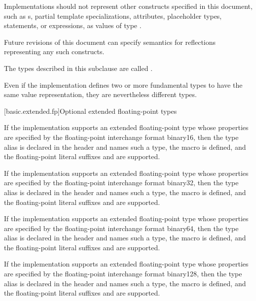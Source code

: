 \pnum
\recommended
Implementations should not represent other constructs
specified in this document, such as
s,
partial template specializations,
attributes, placeholder types,
statements, or
expressions,
as values of type .
\begin{note}
Future revisions of this document can specify semantics for reflections
representing any such constructs.
\end{note}

\pnum
{}%
The types described in this subclause
are called .
\begin{note}
Even if the implementation defines two or more fundamental types to have the
same value representation, they are nevertheless different types.
\end{note}

[basic.extended.fp]{Optional extended floating-point types}

\pnum
If the implementation supports an extended floating-point type
whose properties are specified by
the \IsoFloatUndated{} floating-point interchange format binary16,
then the type alias 
is declared in the header  and names such a type,
the macro  is defined, and
the floating-point literal suffixes  and 
are supported.

\pnum
If the implementation supports an extended floating-point type
whose properties are specified by
the \IsoFloatUndated{} floating-point interchange format binary32,
then the type alias 
is declared in the header  and names such a type,
the macro  is defined, and
the floating-point literal suffixes  and  are supported.

\pnum
If the implementation supports an extended floating-point type
whose properties are specified by
the \IsoFloatUndated{} floating-point interchange format binary64,
then the type alias 
is declared in the header  and names such a type,
the macro  is defined, and
the floating-point literal suffixes  and  are supported.

\pnum
If the implementation supports an extended floating-point type
whose properties are specified by
the \IsoFloatUndated{} floating-point interchange format binary128,
then the type alias 
is declared in the header  and names such a type,
the macro  is defined, and
the floating-point literal suffixes  and  are supported.


